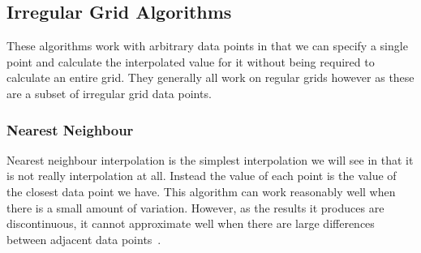 

    \subsection{Irregular Grid Algorithms}\label{background_interpolation_methods_irregular_grid}

        These algorithms work with arbitrary data points in that we can specify a single point and calculate the interpolated value for it without being required to calculate an entire grid. They generally all work on regular grids however as these are a subset of irregular grid data points. 

        \subsubsection{Nearest Neighbour}\label{background_interpolation_methods_nearest_neighbour}

            Nearest neighbour interpolation is the simplest interpolation we will see in that it is not really interpolation at all. Instead the value of each point is the value of the closest data point we have. This algorithm can work reasonably well when there is a small amount of variation. However, as the results it produces are discontinuous, it cannot approximate well when there are large differences between adjacent data points~\cite{imageresamplingcomparison}.

